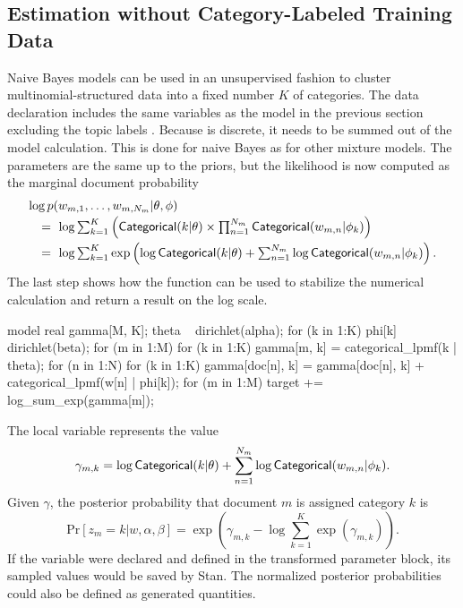 \subsection{Estimation without Category-Labeled Training Data}

Naive Bayes models can be used in an unsupervised fashion to cluster
multinomial-structured data into a fixed number $K$ of categories.  
The data declaration includes the same variables as the model in the
previous section excluding the topic labels .   Because
 is discrete, it needs to be summed out of the model
calculation.  This is done for naive Bayes as for other mixture
models.  The parameters are the same up to the priors, but the
likelihood is now computed as the marginal document probability
\[
\begin{array}{l}
\log p(w_{m,1},\ldots,w_{m,N_m}|\theta,\phi)
\\[2pt]
\ \ \ = \ 
\log \sum_{k=1}^K 
\left( \distro{Categorical}(k|\theta)
        \times \prod_{n=1}^{N_m} \distro{Categorical}(w_{m,n}|\phi_k)
\right)
\\[6pt]
\ \ \ = \ 
\log \sum_{k=1}^K \exp \left(
\log \distro{Categorical}(k|\theta)
+ \sum_{n=1}^{N_m} \log \distro{Categorical}(w_{m,n}|\phi_k)
\right).
\end{array}
\]
%
The last step shows how the  function can be used
to stabilize the numerical calculation and return a result on the log
scale.
%
\begin{stancode}
model {
  real gamma[M, K];
  theta ~ dirichlet(alpha);
  for (k in 1:K)
    phi[k] ~ dirichlet(beta);
  for (m in 1:M) 
    for (k in 1:K) 
      gamma[m, k] = categorical_lpmf(k | theta);
  for (n in 1:N)
    for (k in 1:K)
      gamma[doc[n], k] = gamma[doc[n], k] 
                         + categorical_lpmf(w[n] | phi[k]);
  for (m in 1:M)
    target += log_sum_exp(gamma[m]);
}
\end{stancode}
%
The local variable  represents the value
\[
\gamma_{m,k} = \log \distro{Categorical}(k|\theta)
+ \sum_{n=1}^{N_m} \log \distro{Categorical}(w_{m,n}|\phi_k).
\]
%
Given $\gamma$, the posterior probability that document
$m$ is assigned category $k$ is
\[
\mbox{Pr}[z_m = k|w,\alpha,\beta]
=
\exp \left( 
\gamma_{m,k}
- \log \sum_{k=1}^K \exp \left( \gamma_{m,k} \right)
\right).
\]
%
If the variable  were declared and defined in the
transformed parameter block, its sampled values would be saved by
Stan.  The normalized posterior probabilities could also be defined as
generated quantities.

